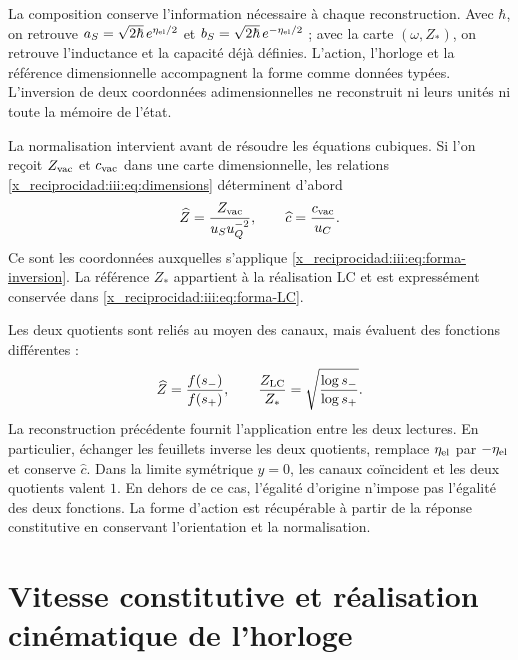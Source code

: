 La composition conserve l’information nécessaire à chaque reconstruction.
Avec $\hbar$, on retrouve
$a_S=\sqrt{2\hbar}\,e^{\eta_{\rm el}/2}$ et
$b_S=\sqrt{2\hbar}\,e^{-\eta_{\rm el}/2}$ ; avec la carte
$(\omega,Z_*)$, on retrouve l’inductance et la capacité déjà définies.
L’action, l’horloge et la référence dimensionnelle accompagnent la forme comme
données typées. L’inversion de deux coordonnées adimensionnelles ne
reconstruit ni leurs unités ni toute la mémoire de l’état.

La normalisation intervient avant de résoudre les équations cubiques.
Si l’on reçoit $Z_{\rm vac}$ et $c_{\rm vac}$ dans une carte dimensionnelle,
les relations \eqref{x_reciprocidad:iii:eq:dimensions} déterminent d’abord
\[
 \widehat Z=\frac{Z_{\rm vac}}{u_Su_Q^{-2}},\qquad
 \widehat c=\frac{c_{\rm vac}}{u_C}.
\]
Ce sont les coordonnées auxquelles s'applique \eqref{x_reciprocidad:iii:eq:forma-inversion}. La référence $Z_*$ appartient à la réalisation LC et est expressément conservée dans \eqref{x_reciprocidad:iii:eq:forma-LC}.

Les deux quotients sont reliés au moyen des canaux, mais évaluent
des fonctions différentes :
\begin{equation}
 \widehat Z=\frac{f(s_-)}{f(s_+)},\qquad
 \frac{Z_{\rm LC}}{Z_*}
       =\sqrt{\frac{\log s_-}{\log s_+}}.
 \label{x_reciprocidad:iii:eq:forma-dos-cocientes}
\end{equation}
La reconstruction précédente fournit l'application entre les deux lectures. En particulier, échanger les feuillets inverse les deux quotients, remplace $\eta_{\rm el}$ par $-\eta_{\rm el}$ et conserve $\widehat c$. Dans la limite symétrique $y=0$, les canaux coïncident et les deux quotients valent $1$. En dehors de ce cas, l'égalité d'origine n'impose pas l'égalité des deux fonctions. La forme d'action est récupérable à partir de la réponse constitutive en conservant l'orientation et la normalisation.



\section{Vitesse constitutive et réalisation cinématique de l’horloge}
\label{x_reciprocidad:iii:sec:enlace-velocidad-constitutiva}

